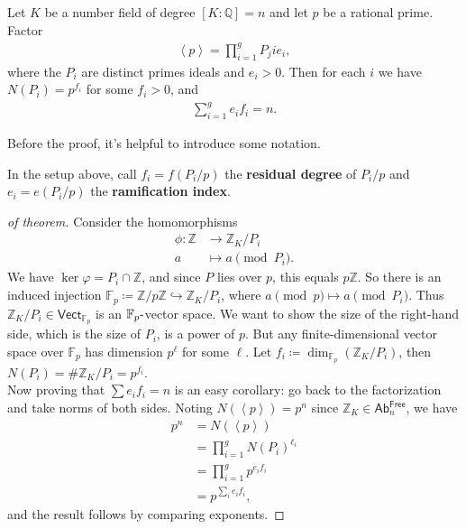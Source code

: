 \begin{theorem}

Let \(K\) be a number field of degree \([K: {\mathbb{Q}}] = n\) and let
\(p\) be a rational prime. Factor
\begin{align*}
\left\langle{ p }\right\rangle = \prod_{i=1}^g P_ji{e_i}
,\end{align*}
where the \(P_i\) are distinct primes ideals and \(e_i > 0\). Then for
each \(i\) we have \(N(P_i) = p^{f_i}\) for some \(f_i > 0\), and
\begin{align*}
\sum_{i=1}^g e_i f_i = n
.\end{align*}

Before the proof, it's helpful to introduce some notation.

\end{theorem}

\begin{definition}

In the setup above, call \(f_i = f(P_i / p)\) the \textbf{residual
degree} of \(P_i/p\) and \(e_i = e(P_i/p)\) the \textbf{ramification
index}.

\end{definition}

\begin{proof}[of theorem]

Consider the homomorphisms
\begin{align*}
\phi: {\mathbb{Z}}&\to {\mathbb{Z}}_K/P_i \\
a &\mapsto a \pmod{P_i}
.\end{align*}
We have \(\ker \varphi = P_i \cap{\mathbb{Z}}\), and since \(P\) lies
over \(p\), this equals \(p{\mathbb{Z}}\). So there is an induced
injection
\({\mathbb{F}}_p \coloneqq{\mathbb{Z}}/p{\mathbb{Z}}\hookrightarrow{\mathbb{Z}}_K/ P_i\),
where \(a\pmod p \mapsto a \pmod P_i\). Thus
\({\mathbb{Z}}_K/P_i \in {\mathsf{Vect}}_{{\mathbb{F}}_p}\) is an
\({\mathbb{F}}_p{\hbox{-}}\)vector space. We want to show the size of
the right-hand side, which is the size of \(P_i\), is a power of \(p\).
But any finite-dimensional vector space over \({\mathbb{F}}_p\) has
dimension \(p^\ell\) for some \(\ell\). Let
\(f_i \coloneqq\dim_{{\mathbb{F}}_p} ({\mathbb{Z}}_K/P_i)\), then
\(N(P_i) = \# {\mathbb{Z}}_K/P_i = p^{f_i}\).\\

Now proving that \(\sum e_i f_i = n\) is an easy corollary: go back to
the factorization and take norms of both sides. Noting
\(N( \left\langle{ p }\right\rangle ) = p^n\) since
\({\mathbb{Z}}_K \in {\mathsf{Ab}}_n^{\mathsf{Free}}\), we have
\begin{align*}
p^n 
&= N( \left\langle{ p }\right\rangle  ) \\
&= \prod_{i=1}^g  N(P_i)^{\ell_i} \\
&= \prod_{i=1}^g p^{e_i f_i} \\
&= p^{\sum_i e_i f_i}
,\end{align*}
and the result follows by comparing exponents.

\end{proof}

